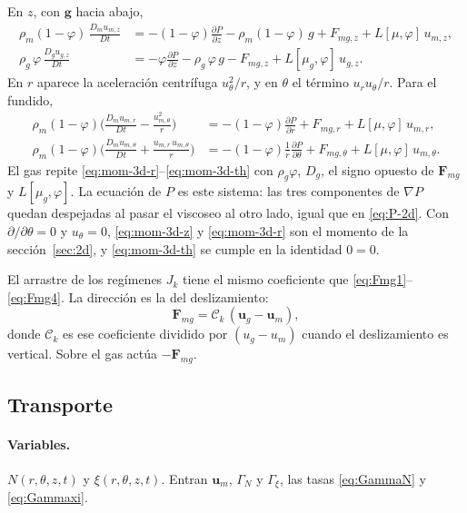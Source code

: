 \documentclass[11pt,a4paper]{article}
\newcommand{\p}{\partial}
\begin{document}
En $z$, con $\mathbf{g}$ hacia abajo,
\begin{equation}
\label{eq:mom-3d-z}
\begin{aligned}
\rho_m(1-\varphi)\,\frac{D_m u_{m,z}}{Dt}
&=
-(1-\varphi)\frac{\p P}{\p z}
-\rho_m(1-\varphi)\,g
+F_{mg,z}
+L[\mu,\varphi]\,u_{m,z},
\\[0.4em]
\rho_g\,\varphi\,\frac{D_g u_{g,z}}{Dt}
&=
-\varphi\frac{\p P}{\p z}
-\rho_g\,\varphi\,g
-F_{mg,z}
+L[\mu_g,\varphi]\,u_{g,z}.
\end{aligned}
\end{equation}
En $r$ aparece la aceleración centrífuga $u_\theta^2/r$, y en
$\theta$ el término $u_r u_\theta/r$. Para el fundido,
\begin{align}
\label{eq:mom-3d-r}
\rho_m(1-\varphi)\Biggl(
\frac{D_m u_{m,r}}{Dt}-\frac{u_{m,\theta}^2}{r}
\Biggr)
&=
-(1-\varphi)\frac{\p P}{\p r}
+F_{mg,r}
+L[\mu,\varphi]\,u_{m,r},
\\
\label{eq:mom-3d-th}
\rho_m(1-\varphi)\Biggl(
\frac{D_m u_{m,\theta}}{Dt}+\frac{u_{m,r}\,u_{m,\theta}}{r}
\Biggr)
&=
-(1-\varphi)\frac{1}{r}\frac{\p P}{\p\theta}
+F_{mg,\theta}
+L[\mu,\varphi]\,u_{m,\theta}.
\end{align}
El gas repite \eqref{eq:mom-3d-r}--\eqref{eq:mom-3d-th} con
$\rho_g\varphi$, $D_g$, el signo opuesto de $\mathbf{F}_{mg}$ y
$L[\mu_g,\varphi]$. La ecuación de $P$ es este sistema: las tres
componentes de $\nabla P$ quedan despejadas al pasar el viscoseo
al otro lado, igual que en \eqref{eq:P-2d}. Con
$\p/\p\theta=0$ y $u_\theta=0$, \eqref{eq:mom-3d-z} y
\eqref{eq:mom-3d-r} son el momento de la sección~\ref{sec:2d}, y
\eqref{eq:mom-3d-th} se cumple en la identidad $0=0$.

El arrastre de los regímenes $J_k$ tiene el mismo coeficiente que
\eqref{eq:Fmg1}--\eqref{eq:Fmg4}. La dirección es la del
deslizamiento:
\begin{equation}
\label{eq:Fmg-vec}
\mathbf{F}_{mg}
=\mathcal{C}_k\,(\mathbf{u}_g-\mathbf{u}_m),
\end{equation}
donde $\mathcal{C}_k$ es ese coeficiente dividido por
$(u_g-u_m)$ cuando el deslizamiento es vertical. Sobre el gas
actúa $-\mathbf{F}_{mg}$.

\subsection{Transporte}

\paragraph{Variables.}
$N(r,\theta,z,t)$ y $\xi(r,\theta,z,t)$. Entran $\mathbf{u}_m$,
$\Gamma_N$ y $\Gamma_\xi$, las tasas \eqref{eq:GammaN} y
\eqref{eq:Gammaxi}.
\end{document}
